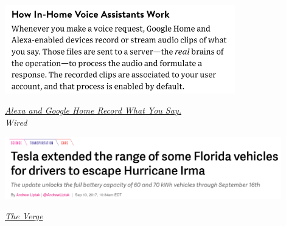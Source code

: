 \begin{frame}[fragile]

  \begin{center}
  \includegraphics[width=10cm]{figs/home-assistants}
  \end{center}

  \begin{flushright}
    {\em
      \href{https://www.wired.com/2016/12/alexa-and-google-record-your-voice/}{Alexa and Google Home Record What You Say.} \\
      Wired \\
      }
  \end{flushright}
  
\end{frame}

\begin{frame}[fragile]

  \begin{center}
  \includegraphics[width=12cm]{figs/tesla}
  \end{center}

  \begin{flushright}
    {\em
      \href{https://www.theverge.com/2017/9/10/16283330/tesla-hurricane-irma-update-florida-extend-range-model-s-x-60-60d}{The Verge} \\
      }
  \end{flushright}
  
\end{frame}


